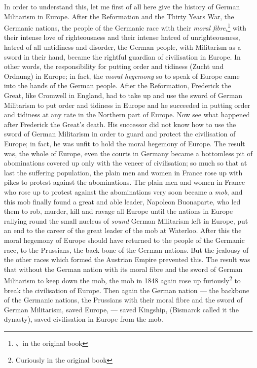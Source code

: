 In order to understand this, let me first of all here give the history of German Militarism in Europe.
After the Reformation and the Thirty Years War, the Germanic nations, the people of the Germanic race with their \emph{moral fibre},\footnote{、in the original book} with their intense love of righteousness and their intense hatred of unrighteousness, hatred of all untidiness and disorder, the German people, with Militarism as a sword in their hand, became the rightful guardian of civilisation in Europe.
In other words, the responsibility for putting order and tidiness (Zucht und Ordnung) in Europe; in fact, the \emph{moral hegemony} so to speak of Europe came into the hands of the German people.
After the Reformation, Frederick the Great, like Cromwell in England, had to take up and use the sword of German Militarism to put order and tidiness in Europe and he succeeded in putting order and tidiness at any rate in the Northern part of Europe.
Now see what happened after Frederick the Great's death.
His successor did not know how to use the sword of German Militarism in order to guard and protect the civilisation of Europe; in fact, he was unfit to hold the moral hegemony of Europe. 
The result was, the whole of Europe, even the courts in Germany became a bottomless pit of abominations covered up only with the veneer of civilisation; so much so that at last the suffering population, the plain men and women in France rose up with pikes to protest against the abominations.
The plain men and women in France who rose up to protest against the abominations very soon became a \emph{mob}, and this mob finally found a great and able leader, Napoleon Buonaparte\cite{num6}, who led them to rob, murder, kill and ravage all Europe until the nations in Europe rallying round the small nucleus of \emph{sound} German Militarism left in Europe, put an end to the career of the great leader of the mob at Waterloo.
After this the moral hegemony of Europe should have returned to the people of the Germanic race, to the Prussians, the back bone of the German nations.
But the jealousy of the other races which formed the Austrian Empire prevented this.
The result was that without the German nation with its moral fibre and the sword of German Militarism to keep down the mob, the mob in 1848 again rose up furiously\footnote{Curiously in the original book} to break the civilisation of Europe.
Then again the German nation --- the backbone of the Germanic nations, the Prussians with their moral fibre and the sword of German Militarism, saved Europe, --- saved Kingship, (Bismarck called it the dynasty), saved civilisation in Europe from the mob.


